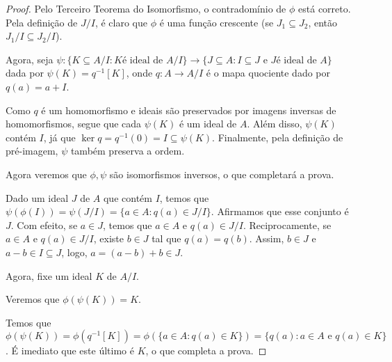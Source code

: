 \begin{proof}
    Pelo Terceiro Teorema do Isomorfismo, o contradomínio de $\phi$ está correto.
    Pela definição de $J/I$, é claro que $\phi$ é uma função crescente (se $J_1\subseteq J_2$, então $J_1/I\subseteq J_2/I$).

    Agora, seja $\psi:\{K\subseteq A/I: K \text{é ideal de } A/I\}\rightarrow \{J\subseteq A: I\subseteq J \text{ e } J \text{é ideal de } A\}$ dada por $\psi(K)=q^{-1}[K]$, onde $q:A\rightarrow A/I$ é o mapa quociente dado por $q(a)=a+I$.

    Como $q$ é um homomorfismo e ideais são preservados por imagens inversas de homomorfismos, segue que cada $\psi(K)$ é um ideal de $A$.
    Além disso, $\psi(K)$ contém $I$, já que $\ker q=q^{-1}(0)=I\subseteq \psi(K)$.
    Finalmente, pela definição de pré-imagem, $\psi$ também preserva a ordem.

    Agora veremos que $\phi, \psi$ são isomorfismos inversos, o que completará a prova.

    Dado um ideal $J$ de $A$ que contém $I$, temos que $\psi(\phi(I))=\psi(J/I)=\{a \in A: q(a)\in J/I\}$.
    Afirmamos que esse conjunto é $J$.
    Com efeito, se $a \in J$, temos que $a \in A$ e $q(a)\in J/I$.
    Reciprocamente, se $a \in A$ e $q(a) \in J/I$, existe $b \in J$ tal que $q(a)=q(b)$.
    Assim, $b \in J$ e $a-b \in I\subseteq J$, logo, $a=(a-b)+b\in J$.

    Agora, fixe um ideal $K$ de $A/I$.
    
    Veremos que $\phi(\psi(K))=K$.

    Temos que $\phi(\psi(K))=\phi(q^{-1}[K])=\phi(\{a \in A: q(a)\in K\})=\{q(a): a \in A \text{ e } q(a) \in K\}$.
    É imediato que este último é $K$, o que completa a prova.
\end{proof}